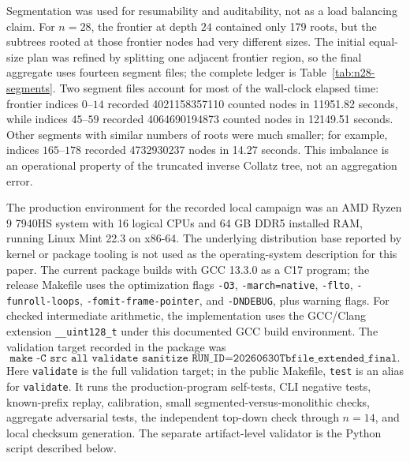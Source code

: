 \documentclass[11pt]{article}
\theoremstyle{definition}
\theoremstyle{remark}
\begin{document}
Segmentation was used for resumability and auditability, not as a load
balancing claim.  For \(n=28\), the frontier at depth \(24\) contained only
179 roots, but the subtrees rooted at those frontier nodes had very different
sizes.  The initial equal-size plan was refined by splitting one adjacent
frontier region, so the final aggregate uses fourteen segment files; the
complete ledger is Table~\ref{tab:n28-segments}.  Two segment files account
for most of the wall-clock elapsed time: frontier indices \(0\)--\(14\)
recorded 4021158357110 counted nodes in 11951.82 seconds, while indices
\(45\)--\(59\) recorded 4064690194873 counted nodes in 12149.51 seconds.
Other segments with similar numbers of roots were much smaller; for example,
indices \(165\)--\(178\) recorded 4732930237 nodes in 14.27 seconds.  This
imbalance is an operational property of the truncated inverse Collatz tree, not
an aggregation error.

The production environment for the recorded local campaign was an AMD Ryzen 9
7940HS system with 16 logical CPUs and 64 GB DDR5 installed RAM, running
Linux Mint 22.3 on x86-64.  The underlying distribution base reported by
kernel or package tooling is not used as the operating-system description for
this paper.  The current package builds with GCC 13.3.0 as a C17 program; the
release Makefile uses the optimization flags \texttt{-O3},
\texttt{-march=native}, \texttt{-flto}, \texttt{-funroll-loops},
\texttt{-fomit-frame-pointer}, and \texttt{-DNDEBUG}, plus warning flags.
For checked intermediate arithmetic, the implementation uses the GCC/Clang
extension \texttt{\_\_uint128\_t} under this documented GCC build environment.
The validation target recorded in the package was
\[
\texttt{make -C src all validate sanitize RUN\_ID=20260630Tbfile\_extended\_final}.
\]
Here \texttt{validate} is the full validation target; in the public Makefile,
\texttt{test} is an alias for \texttt{validate}.  It runs the production-program
self-tests, CLI negative tests, known-prefix replay, calibration, small
segmented-versus-monolithic checks, aggregate adversarial tests, the independent
top-down check through \(n=14\), and local checksum generation.  The separate
artifact-level validator is the Python script described below.
\end{document}
